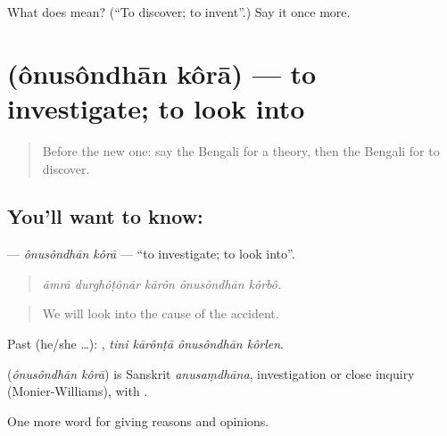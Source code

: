 \begin{tcolorbox}[breakable,colback=teal!4,colframe=teal!35!black,title={Before you move on}]
What does   mean? (\textquotedblleft{}To discover; to invent\textquotedblright{}.) Say it once more.
\end{tcolorbox}
\section[\texorpdfstring{\bn{অনুসন্ধান} \bn{করা} (ônusôndhān kôrā)}{অনুসন্ধান করা (ônusôndhān kôrā)}]{  (ônusôndhān kôrā) — to investigate; to look into}

\label{lesson:BN-C354-onusondhan-kora}



\begin{quote}
Before the new one: say the Bengali for a theory, then the Bengali for to discover.
\end{quote}

\subsection*{You'll want to know:  }
\textbf{ } — \emph{ônusôndhān kôrā} — \textquotedblleft{}to investigate; to look into\textquotedblright{}.

\begin{quote}
    
\end{quote}

\begin{quote}
\emph{āmrā durghôṭônār kārôn ônusôndhān kôrbô.}
\end{quote}

\begin{quote}
We will look into the cause of the accident.
\end{quote}

Past (he/she …):    , \emph{tini kārônṭā ônusôndhān kôrlen}.

\begin{cousinweb}
\textbf{ } (\emph{ônusôndhān kôrā}) is Sanskrit \emph{anusaṃdhāna}, investigation or close inquiry (Monier-Williams), with .
\end{cousinweb}

\begin{grammarlens}[title={What you've built}]
One more word for giving reasons and opinions.
\end{grammarlens}

